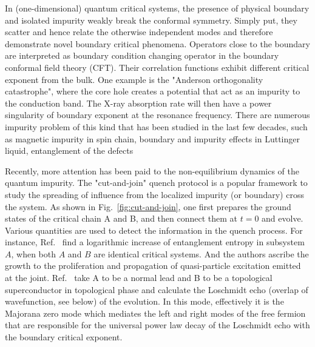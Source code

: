 

In (one-dimensional) quantum critical systems, the presence of physical boundary and isolated impurity weakly break the conformal symmetry. Simply put, they scatter and hence relate the otherwise independent modes and therefore demonstrate novel boundary critical phenomena\cite{cardy_boundary_2004}. Operators close to the boundary are interpreted as boundary condition changing operator\cite{oshikawa_boundary_1997,affleck_boundary_1997} in the boundary conformal field theory (CFT). Their correlation functions exhibit different critical exponent from the bulk\cite{cardy_conformal_1984}. One example is the "Anderson orthogonality catastrophe", where the core hole creates a potential that act as an impurity to the conduction band. The X-ray absorption rate will then have a power singularity of boundary exponent\cite{affleck_boundary_1997} at the resonance frequency. There are numerous impurity problem of this kind that has been studied in the last few decades, such as magnetic impurity in spin chain\cite{eggert_magnetic_1992}, boundary and impurity effects in Luttinger liquid\cite{fabrizio_interacting_1995}, entanglement of the defects\cite{peschel_entanglement_2005, igloi_entanglement_2009,calabrese_entanglement_2012} \etc

Recently, more attention has been paid to the non-equilibrium dynamics of the quantum impurity. The "cut-and-join" quench protocol is a popular framework to study the spreading of influence from the localized impurity (or boundary) cross the system. As shown in Fig.~\ref{fig:cut-and-join}, one first prepares the ground states of the critical chain A and B, and then connect them at $t = 0$ and evolve. Various quantities are used to detect the information in the quench process. For instance, Ref.~ find a logarithmic increase of entanglement entropy in subsystem $A$, when both $A$ and $B$ are identical critical systems. And the authors ascribe the growth to the proliferation and propagation of quasi-particle excitation emitted at the joint. Ref.~ take A to be a normal lead and B to be a topological superconductor in topological phase and calculate the Loschmidt echo (overlap of wavefunction, see below) of the evolution. In this mode, effectively it is the Majorana zero mode which mediates the left and right modes of the free fermion that are responsible for the universal power law decay of the Loschmidt echo with the boundary critical exponent. 

